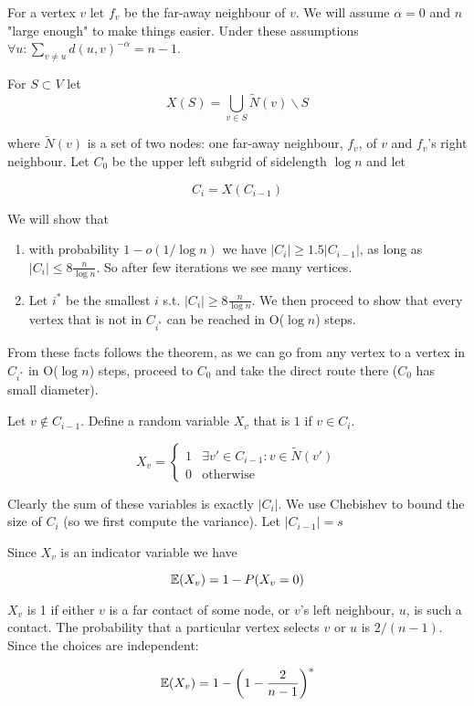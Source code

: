 \begin{pr}For a vertex $v$ let $f_v$ be the far-away neighbour of $v$. We will assume $\alpha=0$ and $n$ "large enough" to make things easier. Under these assumptions $\forall u: \sum_{v\neq u} d(u,v)^{-\alpha} = n-1$. 

For $S\subset V$ let 
\[X(S) = \bigcup_{v\in S} \tilde N(v) \backslash S\]

where $\tilde N(v)$ is a set of two nodes: one far-away neighbour, $f_v$, of $v$ and $f_v$'s right neighbour. Let $C_0$ be the upper left subgrid of sidelength $\log n$ and let

\[C_{i} = X(C_{i-1})\]

We will show that 

\begin{enumerate}
\item with probability $1-o(1/\log n)$ we have $|C_i| \geq 1.5 |C_{i-1}|$, as long as $|C_i| \leq 8 \frac{n}{\log n}$. So after few iterations we see many vertices. 
\item Let $i^*$ be the smallest $i$ s.t. $|C_i| \geq 8\frac{n}{\log n}$. We then proceed to show that every vertex that is not in $C_{i^*}$ can be reached in O($\log n$) steps.
\end{enumerate}

From these facts follows the theorem, as we can go from any vertex to a vertex in $C_{i^*}$ in O($\log n$) steps, proceed to $C_0$ and take the direct route there ($C_0$ has small diameter).

Let $v\not \in C_{i-1}$. Define a random variable $X_v$ that is $1$ if $v\in C_i$.

\[X_v = \begin{cases} 1& \exists v'\in C_{i-1}: v\in \tilde N(v')\\ 0& \text{otherwise}\end{cases}\]

Clearly the sum of these variables is exactly $|C_i|$. We use Chebishev to bound the size of $C_i$ (so we first compute the variance). Let $|C_{i-1}| = s$

Since $X_v$ is an indicator variable we have 

\[\mathbb{E}(X_v) = 1-P(X_v=0)\]
	
$X_v$ is 1 if either $v$ is a far contact of some node, or $v$'s left neighbour, $u$, is such a contact. The probability that a particular vertex selects $v$ or $u$ is $2/(n-1)$. Since the choices are independent:

\[\mathbb{E}(X_v) = 1-\left(1-\frac{2}{n-1}\right)^s\]


\end{pr}
